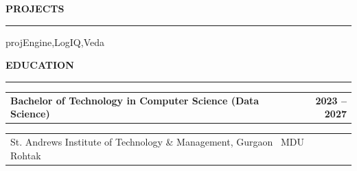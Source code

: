 \documentclass[10pt,letterpaper]{article}
\makeatletter
\newif\ifAiG    %
\newif\ifKult   %
\newcommand{\projorder}{Veda,Engine,LogIQ}
\newcommand{\aigtitleFS}{Software Engineer Intern (Backend, Full Stack \& OSINT)}
\newcommand{\aigtechFS}{TypeScript, React, Node.js, Python, PostgreSQL, MongoDB, Docker, CI/CD}
\newcommand{\aigitemsFS}{%
  \item Contributed across the stack to an intelligence platform (\href{https://intelfetch.dev/}{\color{myblue}Intelfetch}): \textbf{low latency}, deduplicated ingestion microservices for username, phone, email, website, and domain targets, plus frontend and API integration work.
  \item Architected a 5 layer reconnaissance pipeline covering passive discovery, active resolution, web surface probing, and threat intelligence, with structured, schema validated (Zod) output delivery.
  \item Researched and designed an initial lightweight \textbf{Agentic Orchestration} layer \textit{[idea similar to (\href{https://openosint.tech/}{\color{myblue}openosint.tech})]} using native Anthropic tool use APIs, enforcing deterministic tool execution to eliminate hallucinated outputs.
  \item Led the architectural foundation and deployment of the end to end CI/CD infrastructure.
}
\newcommand{\aigtitleSYS}{Software Engineer Intern (Backend, Agent Systems \& OSINT)}
\newcommand{\aigtechSYS}{TypeScript, Python, Anthropic Tool Use, Node.js, PostgreSQL, Docker, GitHub Actions, CI/CD}
\newcommand{\aigitemsSYS}{%
  \item Designed and built an initial lightweight \textbf{agentic orchestration layer} \textit{[idea similar to (\href{https://openosint.tech/}{\color{myblue}openosint.tech})]} on native \textbf{Anthropic tool use APIs}: the model only selects from registered tools, while execution follows \textbf{deterministic rules} that remove hallucinated outputs and constrain tool invocation.
  \item Architected a 5 layer \textbf{OSINT reconnaissance pipeline} (passive discovery, active resolution, web surface probing, threat intelligence) delivering structured output through \textbf{Zod schema validation}.
  \item Built \textbf{low latency}, deduplicated ingestion microservices for username, phone, email, website, and domain targets on the \href{https://intelfetch.dev/}{\color{myblue}Intelfetch} platform.
  \item Led the architectural foundation and deployment of the end to end \textbf{CI/CD infrastructure} with Docker and GitHub Actions.
}
\let\aigtitle\aigtitleFS
\let\aigtech\aigtechFS
\let\aigitems\aigitemsFS
\renewcommand{\projorder}{Veda,Engine,LogIQ,Churn}%
\renewcommand{\projorder}{Engine,LogIQ,Issue,Churn}%
\let\aigtitle\aigtitleSYS \let\aigtech\aigtechSYS \let\aigitems\aigitemsSYS
\renewcommand{\projorder}{Engine,LogIQ,RL,Churn}%
\let\aigtitle\aigtitleSYS \let\aigtech\aigtechSYS \let\aigitems\aigitemsSYS
\renewcommand{\projorder}{Engine,LogIQ,Veda}%
\newcommand{\ressection}[1]{%
  \vspace{1.5pt}%
  \begin{center}{\bfseries\color{myblue}\large #1}\end{center}%
  \vspace{-8pt}%
  {\color{myblue}\rule{\linewidth}{0.8pt}}%
  \vspace{0.5pt}%
}
\newenvironment{rlist}{%
  \begin{itemize}[leftmargin=1.3em, itemsep=0pt, topsep=0pt, parsep=0pt, label=\textbullet]%
}{\end{itemize}}
\newcommand{\entryheader}[2]{%
  \noindent\begin{tabularx}{\linewidth}{@{}X r@{}}\textbf{#1} & \textbf{#2}\end{tabularx}\vspace{-1pt}%
}
\newcommand{\entrysub}[2]{%
  \noindent\begin{tabularx}{\linewidth}{@{}X r@{}}#1 & #2\end{tabularx}\vspace{-1pt}%
}
\newcommand{\techstack}[1]{\vspace{0pt}\noindent{\footnotesize\itshape\color{black!65}Technologies Used: #1}\vspace{1pt}}
\newcommand{\showproj}[1]{\csname proj#1\endcsname}
\makeatother
\begin{document}
\ifAiG
\entryheader{\aigtitle}{May 2026 -- Jul 2026}
\entrysub{\textcolor{myblue}{AiGeeks}}{Remote}

\begin{rlist}
  \aigitems
\end{rlist}
\techstack{\aigtech}
\fi

\ifKult
\entryheader{Data Analyst Intern}{Mar 2025 -- Jul 2025}
\entrysub{\textcolor{myblue}{KultureHire}}{Remote}

\begin{rlist}
  \item Built automated data-cleaning and ETL analysis pipelines; derived actionable performance metrics from large candidate datasets to improve product SLAs.
\end{rlist}
\techstack{Python, SQL, PostgreSQL}
\fi

\ressection{PROJECTS}

\expandafter\forcsvlist\expandafter\showproj\expandafter{\projorder}

\ressection{EDUCATION}

\entryheader{Bachelor of Technology in Computer Science (Data Science)}{2023 -- 2027}
\entrysub{St. Andrews Institute of Technology \& Management, Gurgaon \textbar\ MDU Rohtak}{}
\end{document}
